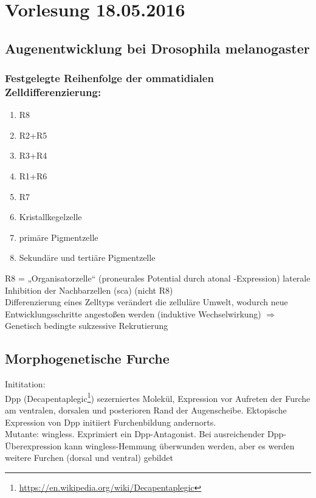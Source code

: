 \section{Vorlesung 18.05.2016}

\subsection{Augenentwicklung bei Drosophila melanogaster}
\subsubsection{Festgelegte Reihenfolge der ommatidialen Zelldifferenzierung:}
\begin{enumerate}
	\item R8
	\item R2+R5
	\item R3+R4
	\item R1+R6
	\item R7
	\item Kristallkegelzelle
	\item primäre Pigmentzelle
	\item Sekundäre und tertiäre Pigmentzelle
\end{enumerate}
R8 = „Organisatorzelle“ (proneurales Potential durch atonal -Expression) laterale Inhibition der Nachbarzellen (sca) (nicht R8)\\

Differenzierung eines Zelltyps verändert die zelluläre Umwelt, wodurch neue Entwicklungsschritte angestoßen werden (induktive Wechselwirkung) $\Rightarrow$
Genetisch bedingte sukzessive Rekrutierung\\

\subsection{Morphogenetische Furche}
Inititation:\\
Dpp (Decapentaplegic\footnote{\url{https://en.wikipedia.org/wiki/Decapentaplegic}}) sezerniertes Molekül, Expression vor Aufreten der Furche am ventralen, dorsalen und posterioren Rand der Augenscheibe. Ektopische Expression von Dpp initiiert Furchenbildung andernorts.\\

Mutante: wingless. Exprimiert ein Dpp-Antagonist. Bei ausreichender Dpp-Überexpression kann wingless-Hemmung überwunden werden, aber es werden weitere Furchen (dorsal und ventral) gebildet\\

